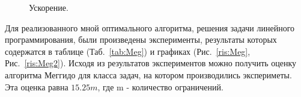 \documentclass[12pt,a4paper]{article}
\begin{document}
\begin{figure}[h!]
\caption{Ускорение.}
\label{ris:0004}
\end{figure}



\newpage
Для реализованного мной оптимального алгоритма, решения задачи линейного программирования, были произведены эксперименты, результаты которых содержатся в таблице (Таб.~\ref{tab:Meg}) и графиках (Рис.~\ref{ris:Meg},  Рис.~\ref{ris:Meg2}). Исходя из результатов экспериментов можно получить оценку алгоритма Меггидо для класса задач, на котором производились экспериметы. Эта оценка равна $15.25m$, где m - количество ограничений. 
\end{document}

